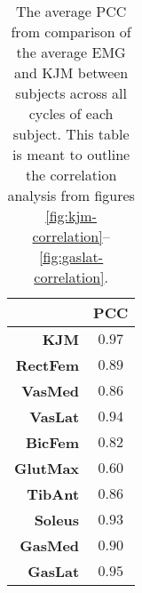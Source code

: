 \begin{table}[]
    \centering
    \caption{The average \ac{PCC} from comparison of the average \ac{EMG} and \ac{KJM} between subjects across all cycles of each subject. This table is meant to outline the correlation analysis from figures \ref{fig:kjm-correlation}--\ref{fig:gaslat-correlation}.}
    \begin{tabular}{r|c}
         &  \textbf{\ac{PCC}} \\ \hline
        \textbf{\ac{KJM}} & $0.97$ \\
        \textbf{RectFem} & $0.89$ \\
        \textbf{VasMed} & $0.86$ \\
        \textbf{VasLat} & $0.94$ \\
        \textbf{BicFem} & $0.82$ \\
        \textbf{GlutMax} & $0.60$ \\
        \textbf{TibAnt} & $0.86$ \\
        \textbf{Soleus} & $0.93$ \\
        \textbf{GasMed} & $0.90$ \\
        \textbf{GasLat} & $0.95$\\ \hline
    \end{tabular}
    \label{tab:correlation-sumup}
\end{table}